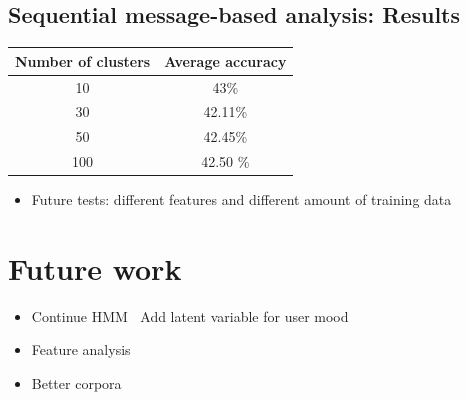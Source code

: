 \documentclass[
paper=128mm:96mm, %
fontsize=11pt, %
pagesize, %
parskip=half-, %
]{scrartcl} %
\newcommand{\red}[1]{\textit{\color{red}{#1}}}
\theoremstyle{mythmstyle} %
\begin{document}

\clearpage


\subsection*{Sequential message-based analysis: Results}

\begin{table}[h]
\centering
\begin{tabular}{c c}
\toprule
\textbf{Number of clusters} & \textbf{Average accuracy} \\
\midrule
10 & 43\% \\
30 & 42.11\%\\
50 & 42.45\%\\
100 & 42.50 \%\\
\bottomrule
\end{tabular}
\end{table} 

\hspace{1cm}

\begin{itemize}
\item Future tests: different features and different amount of training data
\end{itemize}

\clearpage


\section*{Future work}
\begin{itemize}
\item Continue HMM
\subitem \textbullet $\:$ Add latent variable for user mood
\item Feature analysis
\item Better corpora
\end{itemize}

\end{document}
